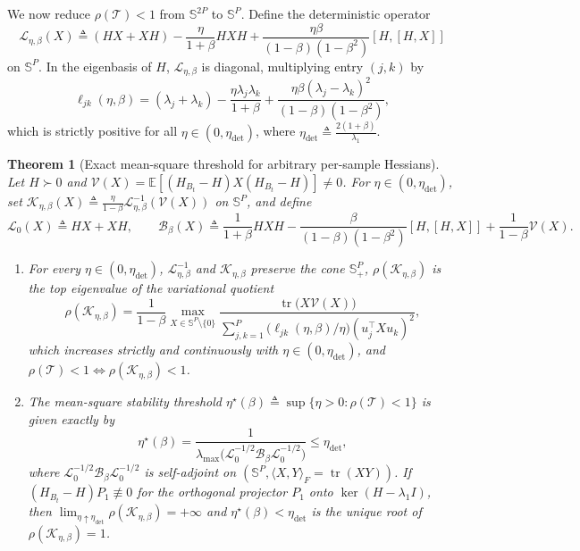 \documentclass[11pt]{article}
\newtheorem{theorem}{Theorem}
\theoremstyle{remark}
\newcommand{\E}{\mathbb{E}}
\newcommand{\tr}{\operatorname{tr}}
\begin{document}
We now reduce $\rho(\mathcal T) < 1$ from $\mathbb S^{2P}$ to $\mathbb S^P$. Define the deterministic operator
\[
\mathcal L_{\eta,\beta}(X) \triangleq (HX + XH) - \frac{\eta}{1+\beta}HXH + \frac{\eta\beta}{(1-\beta)(1-\beta^2)}[H,[H,X]]
\]
on $\mathbb S^P$. In the eigenbasis of $H$, $\mathcal L_{\eta,\beta}$ is diagonal, multiplying entry $(j,k)$ by
\[
\ell_{jk}(\eta,\beta) = (\lambda_j + \lambda_k) - \frac{\eta\lambda_j\lambda_k}{1+\beta} + \frac{\eta\beta(\lambda_j-\lambda_k)^2}{(1-\beta)(1-\beta^2)},
\]
which is strictly positive for all $\eta \in (0, \eta_{\mathrm{det}})$, where $\eta_{\mathrm{det}} \triangleq \frac{2(1+\beta)}{\lambda_1}$.

\begin{theorem}[Exact mean-square threshold for arbitrary per-sample Hessians]\label{thm:general}
Let $H \succ 0$ and $\mathcal V(X) = \E[(H_{B_t}-H)X(H_{B_t}-H)] \ne 0$. For $\eta \in (0, \eta_{\mathrm{det}})$, set $\mathcal K_{\eta,\beta}(X) \triangleq \frac{\eta}{1-\beta}\mathcal L_{\eta,\beta}^{-1}(\mathcal V(X))$ on $\mathbb S^P$, and define
\[
\mathcal L_0(X) \triangleq HX + XH, \qquad \mathcal B_\beta(X) \triangleq \frac{1}{1+\beta}HXH - \frac{\beta}{(1-\beta)(1-\beta^2)}[H,[H,X]] + \frac{1}{1-\beta}\mathcal V(X).
\]
\begin{enumerate}
\item[(1)] For every $\eta \in (0, \eta_{\mathrm{det}})$, $\mathcal L_{\eta,\beta}^{-1}$ and $\mathcal K_{\eta,\beta}$ preserve the cone $\mathbb S^P_+$, $\rho(\mathcal K_{\eta,\beta})$ is the top eigenvalue of the variational quotient
\begin{equation}\label{eq:rayleigh}
\rho(\mathcal K_{\eta,\beta}) = \frac{1}{1-\beta}\max_{X \in \mathbb S^P \setminus \{0\}} \frac{\tr\big(X\mathcal V(X)\big)}{\sum_{j,k=1}^P \big(\ell_{jk}(\eta,\beta)/\eta\big) (u_j^\top X u_k)^2},
\end{equation}
which increases strictly and continuously with $\eta \in (0, \eta_{\mathrm{det}})$, and $\rho(\mathcal T) < 1 \iff \rho(\mathcal K_{\eta,\beta}) < 1$.
\item[(2)] The mean-square stability threshold $\eta^\star(\beta) \triangleq \sup\{\eta > 0 : \rho(\mathcal T) < 1\}$ is given exactly by
\begin{equation}\label{eq:etastar-general}
\eta^\star(\beta) = \frac{1}{\lambda_{\max}\!\big(\mathcal L_0^{-1/2}\mathcal B_\beta \mathcal L_0^{-1/2}\big)} \le \eta_{\mathrm{det}},
\end{equation}
where $\mathcal L_0^{-1/2}\mathcal B_\beta \mathcal L_0^{-1/2}$ is self-adjoint on $(\mathbb S^P, \langle X,Y\rangle_F = \tr(XY))$. If $(H_{B_t}-H)P_1 \not\equiv 0$ for the orthogonal projector $P_1$ onto $\ker(H-\lambda_1 I)$, then $\lim_{\eta \uparrow \eta_{\mathrm{det}}}\rho(\mathcal K_{\eta,\beta}) = +\infty$ and $\eta^\star(\beta) < \eta_{\mathrm{det}}$ is the unique root of $\rho(\mathcal K_{\eta,\beta}) = 1$.
\end{enumerate}
\end{theorem}
\end{document}
